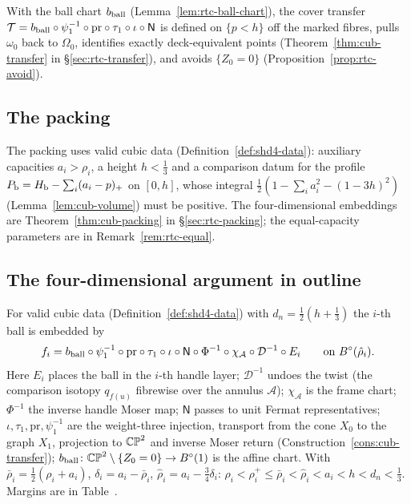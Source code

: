 With the ball chart $b_{\rm ball}$ (Lemma~\ref{lem:rtc-ball-chart}), the cover transfer $\mathcal T=b_{\rm ball}\circ\psi_1^{-1}\circ\mathrm{pr}\circ\tau_1\circ\iota\circ\mathsf N$ is defined on $\{p<h\}$ off the marked fibres, pulls $\omega_0$ back to $\Omega_0$, identifies exactly deck-equivalent points (Theorem~\ref{thm:cub-transfer} in \S\ref{sec:rtc-transfer}), and avoids $\{Z_0=0\}$ (Proposition~\ref{prop:rtc-avoid}).

\subsection{The packing}

The packing uses valid cubic data (Definition~\ref{def:shd4-data}): auxiliary capacities $a_i>\rho_i$, a height
$h<\frac13$ and a comparison datum for the profile $P_{\mathrm b}=H_{\mathrm b}-\sum_i(a_i-p)_+$ on $[0,h]$, whose integral
$\frac12(1-\sum_ia_i^2-(1-3h)^2)$ (Lemma~\ref{lem:cub-volume}) must be positive. The four-dimensional embeddings are
Theorem~\ref{thm:cub-packing} in \S\ref{sec:rtc-packing}; the equal-capacity parameters are in Remark~\ref{rem:rtc-equal}.

\subsection{The four-dimensional argument in outline}\label{sec:mdl-cub-outline}

For valid cubic data (Definition~\ref{def:shd4-data}) with $d_n=\frac12(h+\frac13)$ the $i$-th ball is embedded by
\begin{equation}\label{eq:mdl-cub-chain}
 f_i=b_{\rm ball}\circ\psi_1^{-1}\circ\mathrm{pr}\circ\tau_1\circ\iota\circ\mathsf N\circ\Phi^{-1}\circ\chi_{\mathcal A}
 \circ\mathcal D^{-1}\circ E_i\qquad\text{on }B^{\circ}(\hat\rho_i).
\end{equation}
Here $E_i$ places the ball in the $i$-th handle layer; $\mathcal D^{-1}$ undoes the twist (the comparison isotopy $q_{f(u)}$ fibrewise over the annulus $\mathcal A$); $\chi_{\mathcal A}$ is the frame chart; $\Phi^{-1}$ the inverse handle Moser map; $\mathsf N$ passes to unit Fermat representatives; $\iota,\tau_1,\mathrm{pr},\psi_1^{-1}$ are the weight-three injection, transport from the cone $X_0$ to the graph $X_1$, projection to $\mathbb{CP}^2$ and inverse Moser return (Construction~\ref{cons:cub-transfer}); $b_{\rm ball}\colon\mathbb{CP}^2\setminus\{Z_0=0\}\to B^{\circ}(1)$ is the affine chart. With $\bar\rho_i=\frac12(\rho_i+a_i)$, $\delta_i=a_i-\bar\rho_i$, $\hat\rho_i=a_i-\frac34\delta_i$: $\rho_i<\rho_i^+\le\bar\rho_i<\hat\rho_i<a_i<h<d_n<\tfrac13$. Margins are in Table~.

